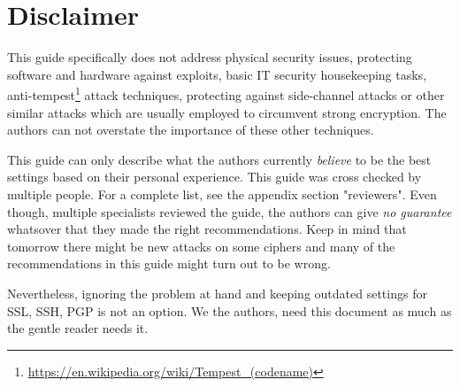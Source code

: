 \section{Disclaimer}
This guide specifically does not address physical security issues, protecting software and hardware against exploits, basic IT security housekeeping tasks, anti-tempest\footnote{\url{https://en.wikipedia.org/wiki/Tempest\_(codename)}} attack techniques, protecting against side-channel attacks or other similar attacks which are usually employed to circumvent strong encryption. The authors can not overstate the importance of these other techniques. 

This guide can only describe what the authors currently \emph{believe} to be the best settings based on their personal experience. This guide was cross checked by multiple people. For a complete list, see the appendix section "reviewers". Even though, multiple specialists reviewed the guide, the authors can give \emph{no guarantee} whatsover that they made the right recommendations. Keep in mind that tomorrow there might be new attacks on some ciphers and many of the recommendations in this guide might turn out to be wrong.



Nevertheless, ignoring the problem at hand and keeping outdated settings for SSL, SSH, PGP is not an option. We the authors, need this document as much as the gentle reader needs it.

